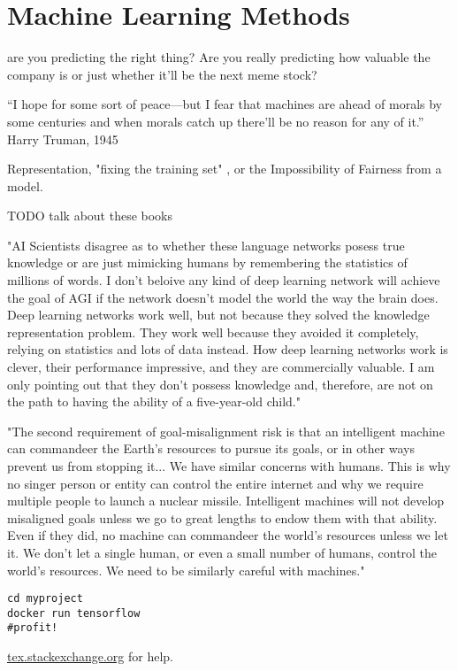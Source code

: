 \setchapterpreamble[u]{\margintoc}
\chapter{Machine Learning Methods}


are you predicting the right thing? Are you really predicting how valuable the company is or just whether it'll be the next meme stock?

“I hope for some sort of peace—but I fear that machines are ahead of morals by some centuries and when morals catch up there'll be no reason for any of it.” Harry Truman, 1945 

Representation, "fixing the training set" , or the Impossibility of Fairness from a model.

TODO talk about these books
\cite{Oneil2017}
\cite{Perez2019}
\cite{Blackman2022Jul}
\cite{Christian2020}



"AI Scientists disagree as to whether these language networks posess true knowledge or are just mimicking humans by remembering the statistics of millions of words. I don't beloive any kind of deep learning network will achieve the goal of AGI if the network doesn't model the world the way the brain does. Deep learning networks work well, but not because they solved the knowledge representation problem. They work well because they avoided it completely, relying on statistics and lots of data instead. How deep learning networks work is clever, their performance impressive, and they are commercially valuable. I am only pointing out that they don't possess knowledge and, therefore, are not on the path to having the ability of a five-year-old child." \cite{hawkins_2022}


"The second requirement of goal-misalignment risk is that an intelligent machine can commandeer the Earth's resources to pursue its goals, or in other ways prevent us from stopping it... We have similar concerns with humans. This is why no singer person or entity can control the entire internet and why we require multiple people to launch a nuclear missile. Intelligent machines will not develop misaligned goals unless we go to great lengths to endow them with that ability. Even if they did, no machine can commandeer the world's resources unless we let it. We don't let a single human, or even a small number of humans, control the world's resources. We need to be similarly careful with machines." \cite{hawkins_2022}

\begin{lstlisting}[style=kaolstplain,linewidth=1.5\textwidth]
cd myproject
docker run tensorflow
#profit!
\end{lstlisting}

\url{tex.stackexchange.org} for help.

